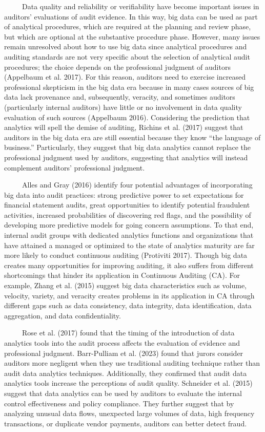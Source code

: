 \documentclass[
  letterpaper,
  DIV=11,
  numbers=noendperiod]{scrreprt}
\begin{document}
~~~~~Data quality and reliability or verifiability have become important
issues in auditors' evaluations of audit evidence. In this way, big data
can be used as part of analytical procedures, which are required at the
planning and review phase, but which are optional at the substantive
procedure phase. However, many issues remain unresolved about how to use
big data since analytical procedures and auditing standards are not very
specific about the selection of analytical audit procedures; the choice
depends on the professional judgment of auditors (Appelbaum et al.
2017). For this reason, auditors need to exercise increased professional
skepticism in the big data era because in many cases sources of big data
lack provenance and, subsequently, veracity, and sometimes auditors
(particularly internal auditors) have little or no involvement in data
quality evaluation of such sources (Appelbaum 2016). Considering the
prediction that analytics will spell the demise of auditing, Richins et
al. (2017) suggest that auditors in the big data era are still essential
because they know ``the language of business.'' Particularly, they
suggest that big data analytics cannot replace the professional judgment
used by auditors, suggesting that analytics will instead complement
auditors' professional judgment.

~~~~~Alles and Gray (2016) identify four potential advantages of
incorporating big data into audit practices: strong predictive power to
set expectations for financial statement audits, great opportunities to
identify potential fraudulent activities, increased probabilities of
discovering red flags, and the possibility of developing more predictive
models for going concern assumptions. To that end, internal audit groups
with dedicated analytics functions and organizations that have attained
a managed or optimized to the state of analytics maturity are far more
likely to conduct continuous auditing (Protiviti 2017). Though big data
creates many opportunities for improving auditing, it also suffers from
different shortcomings that hinder its application in Continuous
Auditing (CA). For example, Zhang et al. (2015) suggest big data
characteristics such as volume, velocity, variety, and veracity creates
problems in its application in CA through different gaps such as data
consistency, data integrity, data identification, data aggregation, and
data confidentiality.

~~~~~Rose et al. (2017) found that the timing of the introduction of
data analytics tools into the audit process affects the evaluation of
evidence and professional judgment. Barr-Pulliam et al. (2023) found
that jurors consider auditors more negligent when they use traditional
auditing technique rather than audit data analytics techniques.
Additionally, they confirmed that audit data analytics tools increase
the perceptions of audit quality. Schneider et al. (2015) suggest that
data analytics can be used by auditors to evaluate the internal control
effectiveness and policy compliance. They further suggest that by
analyzing unusual data flows, unexpected large volumes of data, high
frequency transactions, or duplicate vendor payments, auditors can
better detect fraud.
\end{document}
